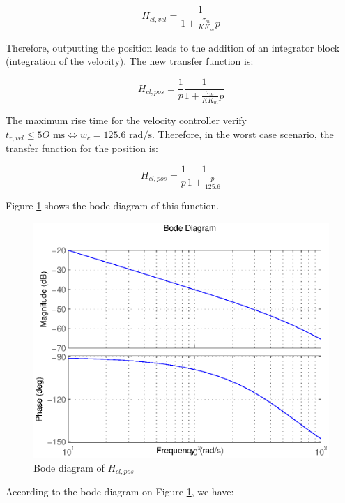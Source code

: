 \begin{equation}
 H_{cl,vel} = \frac{1}{1 + \frac{\tau_m}{K K_m}p}
\end{equation}

Therefore, outputting the position leads to the addition of an integrator block (integration of the velocity). The new transfer function is:

\begin{equation}
 H_{cl,pos} = \frac{1}{p}\frac{1}{1 + \frac{\tau_m}{K K_m}p}
\end{equation}

The maximum rise time for the velocity controller verify $t_{r,vel} \leq 5O \text{ ms} \Leftrightarrow w_c = 125.6 \text{ rad/s}$. Therefore, in the worst case scenario, the transfer function for the position is:

\begin{equation}
 H_{cl,pos} = \frac{1}{p} \frac{1}{1 + \frac{p}{125.6}}
\end{equation}

Figure \ref{bodePos} shows the bode diagram of this function.

\begin{center}
\begin{figure}[Ht]
 \includegraphics[width=\linewidth]{fig/bodePos.eps}
 \caption{Bode diagram of $H_{cl,pos}$}
 \label{bodePos}
\end{figure}
\end{center}

According to the bode diagram on Figure \ref{bodePos}, we have:

